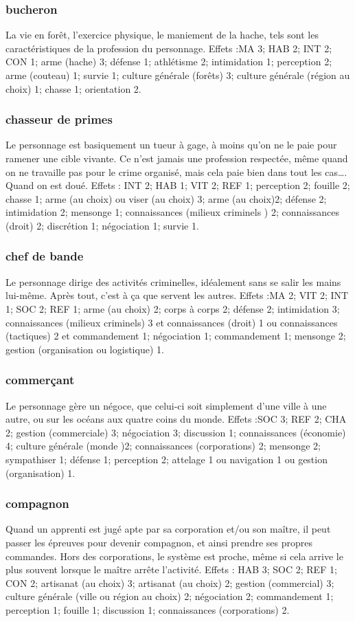 \documentclass[10pt,a4paper,twocolumn]{book}
\begin{document}
\subsubsection{bucheron}
La vie en forêt, l’exercice physique,  le maniement de la hache, tels sont les caractéristiques de la profession du personnage.
Effets :MA 3; HAB 2; INT 2; CON 1; arme (hache) 3; défense 1; athlétisme 2; intimidation 1; perception 2; arme (couteau) 1; survie 1; culture générale (forêts) 3; culture générale (région au choix) 1; chasse 1; orientation 2.
\subsubsection{chasseur de primes}
Le personnage est basiquement un tueur à gage, à moins qu’on ne le paie pour ramener une cible vivante. Ce n’est jamais une profession respectée, même quand on ne travaille pas pour le crime organisé, mais cela paie bien dans tout les cas…. Quand on est doué.
Effets : INT 2; HAB 1; VIT 2; REF 1; perception 2; fouille 2; chasse 1; arme (au choix) ou viser (au choix) 3; arme (au choix)2; défense 2; intimidation 2; mensonge 1; connaissances (milieux criminels ) 2; connaissances (droit) 2; discrétion 1; négociation 1; survie 1.
\subsubsection{chef de bande}
Le personnage dirige des activités criminelles, idéalement sans se salir les mains lui-même. Après tout, c’est à ça que servent les autres. 
Effets :MA 2; VIT 2; INT 1; SOC 2; REF 1; arme (au choix) 2; corps à corps 2; défense 2; intimidation 3; connaissances (milieux criminels) 3 et connaissances (droit) 1 ou connaissances (tactiques) 2 et commandement 1; négociation 1; commandement 1; mensonge 2; gestion (organisation ou logistique) 1.
\subsubsection{commerçant}
Le personnage gère un négoce, que celui-ci soit simplement d’une ville à une autre, ou sur les océans aux quatre coins du monde.
Effets :SOC 3; REF 2; CHA 2; gestion (commerciale) 3; négociation 3; discussion 1; connaissances (économie) 4; culture générale (monde )2; connaissances (corporations) 2; mensonge 2; sympathiser 1; défense 1; perception 2; attelage 1 ou navigation 1 ou gestion (organisation) 1.  

\subsubsection{compagnon}
Quand un apprenti est jugé apte par sa corporation et/ou son maître, il peut passer les épreuves pour devenir compagnon, et ainsi prendre ses propres commandes. Hors des corporations, le système est proche, même si cela arrive le plus souvent lorsque le maître arrête l’activité.
Effets : HAB 3; SOC 2; REF 1; CON 2; artisanat (au choix) 3; artisanat (au choix) 2; gestion (commercial) 3; culture générale (ville ou région au choix) 2; négociation 2; commandement 1; perception 1; fouille 1; discussion 1; connaissances (corporations) 2.
\end{document}

